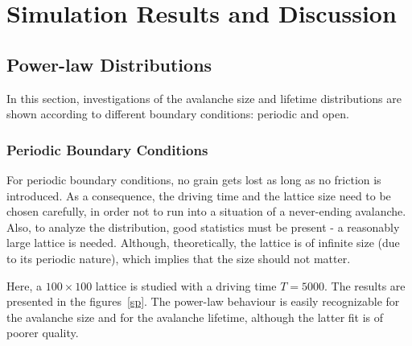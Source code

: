 \chapter{Simulation Results and Discussion}
\thispagestyle{fancy}



\section{Power-law Distributions}

In this section, investigations of the avalanche size and lifetime distributions are shown according to different boundary conditions: periodic and open.


\subsection{Periodic Boundary Conditions}

For periodic boundary conditions, no grain gets lost as long as no friction is introduced. As a consequence, the driving time and the lattice size need to be chosen carefully, in order not to run into a situation of a never-ending avalanche. Also, to analyze the distribution, good statistics must be present - a reasonably large lattice is needed. Although, theoretically, the lattice is of infinite size (due to its periodic nature), which implies that the size should not matter.

Here, a $100\times 100$ lattice is studied with a driving time $T=5000$. The results are presented in the figures~\ref{sp}. The power-law behaviour is easily recognizable for the avalanche size and for the avalanche lifetime, although the latter fit is of poorer quality.

